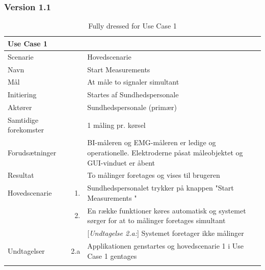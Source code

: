 \subsubsection{Version 1.1} 
\begin{longtabu} to  %
	{\large \textbf{Use Case 1 }} && \\
	\toprule
	Scenarie 				&&	Hovedscenarie\\
	Navn 					&& 	Start Measurements\\
	Mål 					&& 	At måle to signaler simultant \\
	Initiering 				&& 	Startes af Sundhedspersonale\\
	Aktører 				&& 	Sundhedspersonale (primær)\\
	
	Samtidige forekomster  	&& 	1 måling pr. kørsel \\
	Forudsætninger 			&&	BI-måleren og EMG-måleren er ledige og operationelle. Elektroderne påsat måleobjektet og GUI-vinduet er åbent \\ 
	Resultat 				&& 	To målinger foretages og vises til brugeren\\ \midrule
	Hovedscenarie 			&    1. 	&	Sundhedspersonalet trykker på knappen "Start Measurements "\\				 	
							&    2. 	& 	En række funktioner køres automatisk og systemet sørger for at to målinger foretages simultant\\
	
	
	&&[\textit{Undtagelse 2.a:}] Systemet foretager ikke målinger\\ \midrule						
							
							
	Undtagelser 			&		2.a	& 	Applikationen genstartes og hovedscenarie 1 i Use Case 1 gentages \\ \bottomrule
	
	\caption{Fully dressed for Use Case 1}
	\label{UC1}
\end{longtabu}




